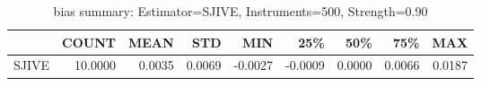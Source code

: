 \begin{table}[ht]
\centering
\caption{bias summary: Estimator=SJIVE, Instruments=500, Strength=0.90}
\begin{tabular}{lrrrrrrrr}
\toprule
 & COUNT & MEAN & STD & MIN & 25\% & 50\% & 75\% & MAX \\
\midrule
SJIVE & 10.0000 & 0.0035 & 0.0069 & -0.0027 & -0.0009 & 0.0000 & 0.0066 & 0.0187 \\
\bottomrule
\end{tabular}
\end{table}
